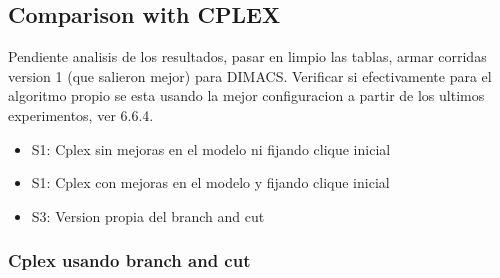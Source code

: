 \subsection{Comparison with CPLEX}

Pendiente analisis de los resultados, pasar en limpio las tablas, armar corridas version 1 (que salieron mejor) para DIMACS. Verificar si efectivamente para el algoritmo propio se esta usando la mejor configuracion a partir de los ultimos experimentos, ver 6.6.4.

\begin{itemize}

\item S1: Cplex sin mejoras en el modelo ni fijando clique inicial
\item S1: Cplex con mejoras en el modelo y fijando clique inicial
\item S3: Version propia del branch and cut

\end{itemize}

\clearpage

\subsubsection{Cplex usando branch and cut}

